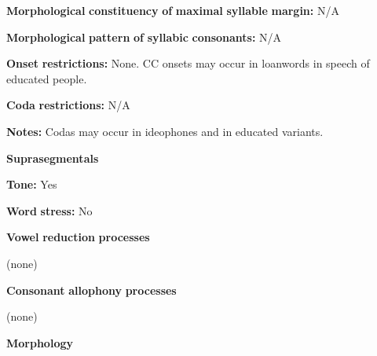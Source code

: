 \begin{styleBody}
\textbf{Morphological} \textbf{constituency} \textbf{of} \textbf{maximal} \textbf{syllable} \textbf{margin:} N/A
\end{styleBody}

\begin{styleBody}
\textbf{Morphological} \textbf{pattern} \textbf{of} \textbf{syllabic} \textbf{consonants:} N/A
\end{styleBody}

\begin{styleBody}
\textbf{Onset} \textbf{restrictions:} None. CC onsets may occur in loanwords in speech of educated people.
\end{styleBody}

\begin{styleBody}
\textbf{Coda} \textbf{restrictions:} N/A
\end{styleBody}

\begin{styleBody}
\textbf{Notes:} Codas may occur in ideophones and in educated variants.
\end{styleBody}

\begin{styleBody}
\textbf{Suprasegmentals}
\end{styleBody}

\begin{styleBody}
\textbf{Tone:} Yes
\end{styleBody}

\begin{styleBody}
\textbf{Word} \textbf{stress:} No
\end{styleBody}

\begin{styleBody}
\textbf{Vowel} \textbf{reduction} \textbf{processes}
\end{styleBody}

\begin{styleBody}
(none)
\end{styleBody}

\begin{styleBody}
\textbf{Consonant} \textbf{allophony} \textbf{processes}
\end{styleBody}

\begin{styleBody}
(none)
\end{styleBody}

\begin{styleBody}
\textbf{Morphology}
\end{styleBody}


